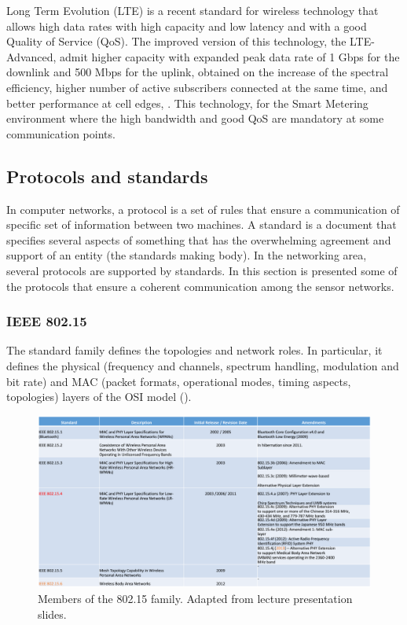 Long Term Evolution (LTE) is a recent standard for wireless technology that allows high data rates with high capacity and low latency and with a good Quality of Service (QoS). The improved version of this technology, the LTE-Advanced, admit higher capacity with expanded peak data rate of 1 Gbps for the downlink and 500 Mbps for the uplink, obtained on the increase of the spectral efficiency, higher  number of active subscribers connected at the same time, and better performance at cell edges, \cite{Mohassel2014}. This technology, for the Smart Metering environment where the high bandwidth and good QoS are mandatory at some communication points.


\subsection{Protocols and standards}

In computer networks, a protocol is a set of rules that ensure a communication of specific set of information between two machines. A standard is a document that specifies several aspects of something that has the overwhelming agreement and support of an entity (the standards making body). In the networking area, several protocols are supported by standards. In this section is presented some of the protocols that ensure a coherent communication among the sensor networks.

\subsubsection{IEEE 802.15}

The standard family defines the topologies and network roles. In particular, it defines the physical (frequency and channels, spectrum handling, modulation and bit rate) and MAC (packet formats, operational modes, timing aspects, topologies) layers of the OSI model (\cite{Hackmann2006}).


\begin{figure}[h!]
	\centering
	\includegraphics[width=1.1\textwidth,keepaspectratio]{figures/nancy2014}
	\caption{Members of the 802.15 family. Adapted from \cite{nancy2014} lecture presentation slides.}
	\label{fig:nancy2014}
\end{figure}

